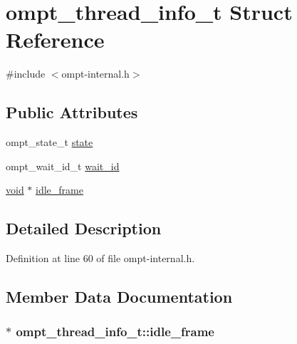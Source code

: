 \hypertarget{structompt__thread__info__t}{\section{ompt\-\_\-thread\-\_\-info\-\_\-t Struct Reference}
\label{structompt__thread__info__t}
}


{\ttfamily \#include $<$ompt-\/internal.\-h$>$}

\subsection*{Public Attributes}
\begin{DoxyCompactItemize}
\item 
ompt\-\_\-state\-\_\-t \hyperlink{structompt__thread__info__t_afeb7d0d4a4e6602ecebd9f2adf87580f}{state}
\item 
ompt\-\_\-wait\-\_\-id\-\_\-t \hyperlink{structompt__thread__info__t_a8655f45d3e0fe40c28f0a49076a560c3}{wait\-\_\-id}
\item 
\hyperlink{ittnotify__static_8h_af941d56e55e3c5465135b60c4d6343ed}{void} $\ast$ \hyperlink{structompt__thread__info__t_af7662490a9f207a1c609d3280bccc0e6}{idle\-\_\-frame}
\end{DoxyCompactItemize}


\subsection{Detailed Description}


Definition at line 60 of file ompt-\/internal.\-h.



\subsection{Member Data Documentation}
\hypertarget{structompt__thread__info__t_af7662490a9f207a1c609d3280bccc0e6}{
\subsubsection[{idle\-\_\-frame}]{$\ast$ ompt\-\_\-thread\-\_\-info\-\_\-t\-::idle\-\_\-frame}}\label{structompt__thread__info__t_af7662490a9f207a1c609d3280bccc0e6}


